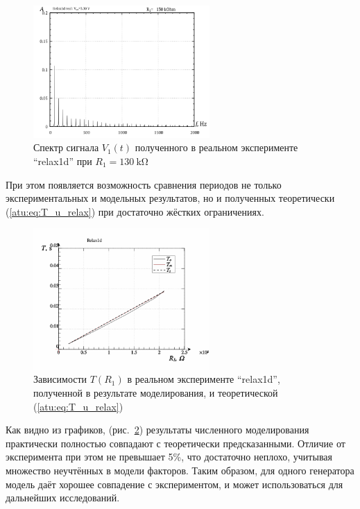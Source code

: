 \begin{figure}[htb!]
  \centerline{\includegraphics[width=0.6\textwidth]{p/relax1d_f_r1=130k.png} }
  \caption{Спектр сигнала $V_1(t)$ полученного в реальном эксперименте ``relax1d'' при $R_1=\SI{130}{\kilo\ohm}$}
  \label{atu:f:relax1d_f_r1}
\end{figure}

При этом появляется возможность сравнения периодов не только
экспериментальных и модельных результатов, но и полученных
теоретически (\ref{atu:eq:T_u_relax}) при достаточно жёстких ограничениях.


\begin{figure}[htb!]
  \centerline{\includegraphics[width=0.6\textwidth]{p/relax1d_read_cmp-p_R1_T.png} }
  \caption{Зависимости $T(R_1)$ в реальном эксперименте ``relax1d'', полученной в результате моделирования, и теоретической (\ref{atu:eq:T_u_relax})}
  \label{atu:f:relax1d_read_cmp-p_R1_T}
\end{figure}


Как видно из графиков, (рис.~\ref{atu:f:relax1d_read_cmp-p_R1_T}) результаты
численного моделирования практически полностью совпадают с теоретически
предсказанными. Отличие от эксперимента при этом не превышает 5\%,
что достаточно неплохо, учитывая множество неучтённых в модели факторов.
Таким образом, для одного генератора
модель даёт хорошее совпадение с экспериментом, и может использоваться для
дальнейших исследований.

